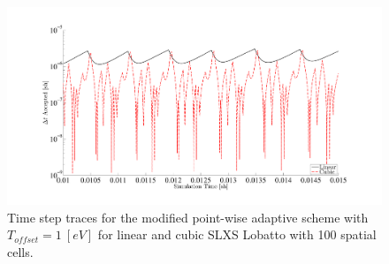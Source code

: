 \begin{figure}[!htp]
\centering
\includegraphics[width=16cm,trim=2in  0.4in 0.5in 0.75in,clip=true]{chapter6_grey_radtran/Dissertation_Data/S8_P1_vs_P3_Pointwise_in_time_zoom.pdf}
\caption{Time step traces for the modified point-wise adaptive scheme with $T_{offset}=1~[eV]$ for linear and cubic SLXS Lobatto with 100 spatial cells.}
\label{fig:p1_vs_p3_structure}
\end{figure}

